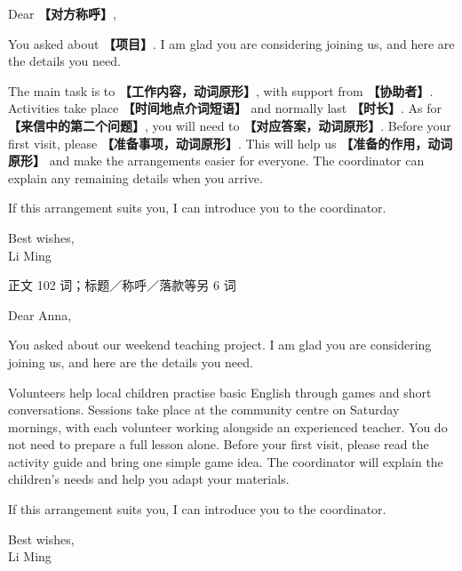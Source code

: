 \documentclass[11pt,a4paper,fontset=macnew]{ctexart}
\newenvironment{writing}{\begingroup\fontsize{10.5}{13.5}\selectfont\setlength{\parskip}{3pt}}{\par\endgroup}
\newenvironment{example}{\begingroup\fontsize{11}{14.3}\selectfont\setlength{\parskip}{4pt}}{\par\endgroup}
\begin{document}
\begin{writing}
\noindent Dear {\bfseries 【对方称呼】},\par
You asked about {\bfseries 【项目】}. I am glad you are considering joining us, and here are the details you need.

The main task is to {\bfseries 【工作内容，动词原形】}, with support from {\bfseries 【协助者】}. Activities take place {\bfseries 【时间地点介词短语】} and normally last {\bfseries 【时长】}. As for {\bfseries 【来信中的第二个问题】}, you will need to {\bfseries 【对应答案，动词原形】}. Before your first visit, please {\bfseries 【准备事项，动词原形】}. This will help us {\bfseries 【准备的作用，动词原形】} and make the arrangements easier for everyone. The coordinator can explain any remaining details when you arrive.

If this arrangement suits you, I can introduce you to the coordinator.

\noindent Best wishes,\\Li Ming\par
\end{writing}
\par\vspace{4pt}{\bfseries 完整套用示例}\par\nopagebreak
{\small 正文 102 词；标题／称呼／落款等另 6 词}\par
\begin{example}
\noindent Dear Anna,\par
You asked about our weekend teaching project. I am glad you are considering joining us, and here are the details you need.

Volunteers help local children practise basic English through games and short conversations. Sessions take place at the community centre on Saturday mornings, with each volunteer working alongside an experienced teacher. You do not need to prepare a full lesson alone. Before your first visit, please read the activity guide and bring one simple game idea. The coordinator will explain the children's needs and help you adapt your materials.

If this arrangement suits you, I can introduce you to the coordinator.

\noindent Best wishes,\\Li Ming\par
\end{example}
\par\vspace{4pt}{\bfseries 好词好句：优先记这三处}\par\nopagebreak
\end{document}
